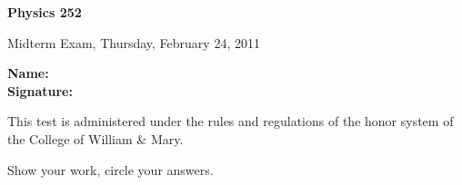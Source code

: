 \documentclass[letterpaper,addpoints,answers]{exam}
\begin{document}

\begin{coverpages}
	\noindent 
  \large\bfseries Physics 252

  \vspace{2ex}
	\noindent 
  Midterm Exam, Thursday,  February  24, 2011

  \vspace{5ex}
	\noindent 
  \large\bfseries Name:\enspace\makebox[2in]{\hrulefill}\\

  \vspace{5ex}
	\noindent 
  \large\bfseries Signature:\enspace\makebox[2in]{\hrulefill}

  \vspace{5ex}
	\noindent 
	This test is administered under the rules and regulations of the honor 
	system of the College of William \& Mary.  

  \vspace{5ex}
	\noindent 
	Show your work, circle your answers.


  \vspace{5ex}
  \gradetable[v][questions]
\end{coverpages}
 
\end{document}
